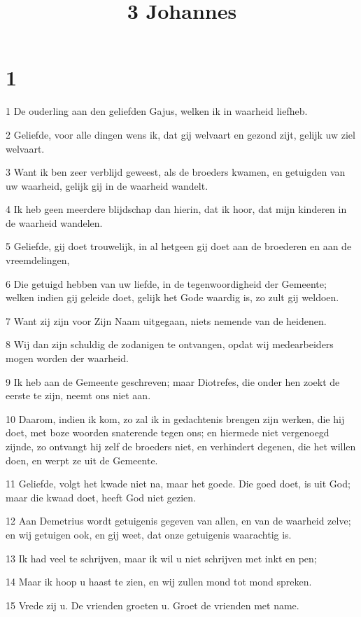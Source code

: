 

\title{3 Johannes}



\chapter{1}

\par 1 De ouderling aan den geliefden Gajus, welken ik in waarheid liefheb.
\par 2 Geliefde, voor alle dingen wens ik, dat gij welvaart en gezond zijt, gelijk uw ziel welvaart.
\par 3 Want ik ben zeer verblijd geweest, als de broeders kwamen, en getuigden van uw waarheid, gelijk gij in de waarheid wandelt.
\par 4 Ik heb geen meerdere blijdschap dan hierin, dat ik hoor, dat mijn kinderen in de waarheid wandelen.
\par 5 Geliefde, gij doet trouwelijk, in al hetgeen gij doet aan de broederen en aan de vreemdelingen,
\par 6 Die getuigd hebben van uw liefde, in de tegenwoordigheid der Gemeente; welken indien gij geleide doet, gelijk het Gode waardig is, zo zult gij weldoen.
\par 7 Want zij zijn voor Zijn Naam uitgegaan, niets nemende van de heidenen.
\par 8 Wij dan zijn schuldig de zodanigen te ontvangen, opdat wij medearbeiders mogen worden der waarheid.
\par 9 Ik heb aan de Gemeente geschreven; maar Diotrefes, die onder hen zoekt de eerste te zijn, neemt ons niet aan.
\par 10 Daarom, indien ik kom, zo zal ik in gedachtenis brengen zijn werken, die hij doet, met boze woorden snaterende tegen ons; en hiermede niet vergenoegd zijnde, zo ontvangt hij zelf de broeders niet, en verhindert degenen, die het willen doen, en werpt ze uit de Gemeente.
\par 11 Geliefde, volgt het kwade niet na, maar het goede. Die goed doet, is uit God; maar die kwaad doet, heeft God niet gezien.
\par 12 Aan Demetrius wordt getuigenis gegeven van allen, en van de waarheid zelve; en wij getuigen ook, en gij weet, dat onze getuigenis waarachtig is.
\par 13 Ik had veel te schrijven, maar ik wil u niet schrijven met inkt en pen;
\par 14 Maar ik hoop u haast te zien, en wij zullen mond tot mond spreken.
\par 15 Vrede zij u. De vrienden groeten u. Groet de vrienden met name.


